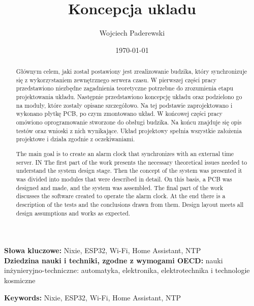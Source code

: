 \documentclass[../main.tex]{subfiles}
\author{Wojciech Paderewski}
\date{\today}
\title{Koncepcja ukladu}
\begin{document}
\begin{abstract}
  Głównym celem, jaki został postawiony jest zrealizowanie budzika, który synchronizuje się z wykorzystaniem zewnętrznego serwera czasu. W 
  pierwszej części pracy przedstawiono niezbędne zagadnienia teoretyczne potrzebne do zrozumienia etapu projektowania układu. Następnie przedstawiono koncepcję układu oraz
  podzielono go na moduły, które zostały opisane szczegółowo. Na tej podstawie zaprojektowano i wykonano płytkę PCB, po czym zmontowano układ.
  W końcowej części pracy omówiono oprogramowanie stworzone do obsługi budzika. Na końcu znajduje się opis testów oraz wnioski z nich wynikające. Układ projektowy
  spełnia wszystkie założenia projektowe i działa zgodnie z oczekiwaniami.
\end{abstract}
\textbf{Słowa kluczowe:} Nixie, ESP32, Wi-Fi, Home Assistant, NTP \\
\textbf{Dziedzina nauki i techniki, zgodne z wymogami OECD:} nauki inżynieryjno-techniczne: automatyka, elektronika, elektrotechnika i technologie kosmiczne
\newpage
{}
\begin{abstract}
  The main goal is to create an alarm clock that synchronizes with an external time server. IN 
  The first part of the work presents the necessary theoretical issues needed to understand the system design stage. Then the concept of the system was presented
  it was divided into modules that were described in detail. On this basis, a PCB was designed and made, and the system was assembled.
  The final part of the work discusses the software created to operate the alarm clock. At the end there is a description of the tests and the conclusions drawn from them. Design layout
  meets all design assumptions and works as expected.
\end{abstract}
\textbf{Keywords:} Nixie, ESP32, Wi-Fi, Home Assistant, NTP
\end{document}
